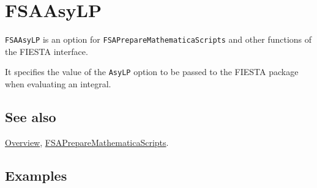 \documentclass[../FeynHelpersManual.tex]{subfiles}
\begin{document}
\begin{Shaded}
\begin{Highlighting}[]
 
\end{Highlighting}
\end{Shaded}

\hypertarget{fsaasylp}{
\section{FSAAsyLP}\label{fsaasylp}}

\texttt{FSAAsyLP} is an option for \texttt{FSAPrepareMathematicaScripts}
and other functions of the FIESTA interface.

It specifies the value of the \texttt{AsyLP} option to be passed to the
FIESTA package when evaluating an integral.

\subsection{See also}

\hyperlink{toc}{Overview},
\hyperlink{fsapreparemathematicascripts}{FSAPrepareMathematicaScripts}.

\subsection{Examples}
\end{document}
